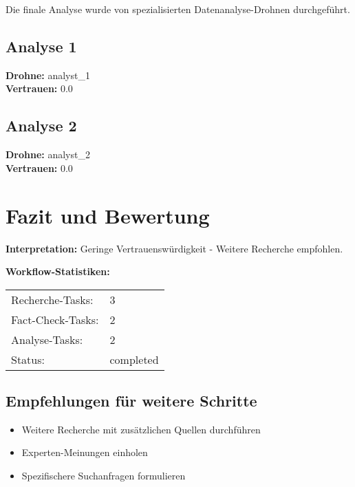 \documentclass[12pt,a4paper]{article}
\begin{document}
Die finale Analyse wurde von spezialisierten Datenanalyse-Drohnen durchgeführt.

\subsection{Analyse 1}

\textbf{Drohne:} analyst\_1\\
\textbf{Vertrauen:} 0.0%

\subsection{Analyse 2}

\textbf{Drohne:} analyst\_2\\
\textbf{Vertrauen:} 0.0%


\newpage
\section{Fazit und Bewertung}


\textbf{Interpretation:} Geringe Vertrauenswürdigkeit - Weitere Recherche empfohlen.

\textbf{Workflow-Statistiken:}
\begin{tabular}{ll}
Recherche-Tasks: & 3 \\
Fact-Check-Tasks: & 2 \\
Analyse-Tasks: & 2 \\
Status: & completed \\
\end{tabular}

\subsection{Empfehlungen für weitere Schritte}

\begin{itemize}
\item Weitere Recherche mit zusätzlichen Quellen durchführen
\item Experten-Meinungen einholen
\item Spezifischere Suchanfragen formulieren
\end{itemize}
\end{document}
